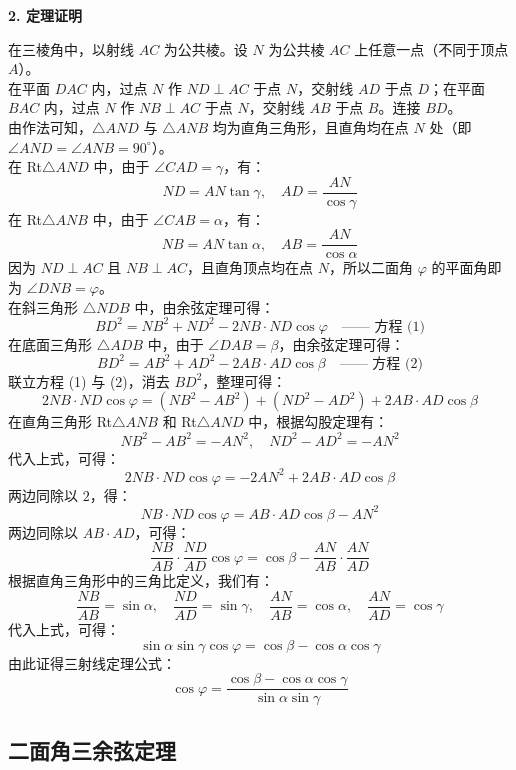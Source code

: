 \documentclass[11pt,a4paper]{ctexart}
\begin{document}
\noindent\textbf{2. 定理证明}\par
在三棱角中，以射线 $AC$ 为公共棱。设 $N$ 为公共棱 $AC$ 上任意一点（不同于顶点 $A$）。\\
在平面 $DAC$ 内，过点 $N$ 作 $ND \perp AC$ 于点 $N$，交射线 $AD$ 于点 $D$；在平面 $BAC$ 内，过点 $N$ 作 $NB \perp AC$ 于点 $N$，交射线 $AB$ 于点 $B$。连接 $BD$。\\
由作法可知，$\triangle AND$ 与 $\triangle ANB$ 均为直角三角形，且直角均在点 $N$ 处（即 $\angle AND = \angle ANB = 90^\circ$）。\\
在 Rt$\triangle AND$ 中，由于 $\angle CAD = \gamma$，有：
\[ ND = AN \tan\gamma, \quad AD = \frac{AN}{\cos\gamma} \]
在 Rt$\triangle ANB$ 中，由于 $\angle CAB = \alpha$，有：
\[ NB = AN \tan\alpha, \quad AB = \frac{AN}{\cos\alpha} \]
因为 $ND \perp AC$ 且 $NB \perp AC$，且直角顶点均在点 $N$，所以二面角 $\varphi$ 的平面角即为 $\angle DNB = \varphi$。\\
在斜三角形 $\triangle NDB$ 中，由余弦定理可得：
\[ BD^2 = NB^2 + ND^2 - 2 NB \cdot ND \cos\varphi \quad \text{—— 方程 (1)} \]
在底面三角形 $\triangle ADB$ 中，由于 $\angle DAB = \beta$，由余弦定理可得：
\[ BD^2 = AB^2 + AD^2 - 2 AB \cdot AD \cos\beta \quad \text{—— 方程 (2)} \]
联立方程 (1) 与 (2)，消去 $BD^2$，整理可得：
\[ 2 NB \cdot ND \cos\varphi = (NB^2 - AB^2) + (ND^2 - AD^2) + 2 AB \cdot AD \cos\beta \]
在直角三角形 Rt$\triangle ANB$ 和 Rt$\triangle AND$ 中，根据勾股定理有：
\[ NB^2 - AB^2 = -AN^2, \quad ND^2 - AD^2 = -AN^2 \]
代入上式，可得：
\[ 2 NB \cdot ND \cos\varphi = -2 AN^2 + 2 AB \cdot AD \cos\beta \]
两边同除以 $2$，得：
\[ NB \cdot ND \cos\varphi = AB \cdot AD \cos\beta - AN^2 \]
两边同除以 $AB \cdot AD$，可得：
\[ \frac{NB}{AB} \cdot \frac{ND}{AD} \cos\varphi = \cos\beta - \frac{AN}{AB} \cdot \frac{AN}{AD} \]
根据直角三角形中的三角比定义，我们有：
\[ \frac{NB}{AB} = \sin\alpha, \quad \frac{ND}{AD} = \sin\gamma, \quad \frac{AN}{AB} = \cos\alpha, \quad \frac{AN}{AD} = \cos\gamma \]
代入上式，可得：
\[ \sin\alpha \sin\gamma \cos\varphi = \cos\beta - \cos\alpha \cos\gamma \]
由此证得三射线定理公式：
\[ \cos\varphi = \frac{\cos\beta - \cos\alpha \cos\gamma}{\sin\alpha \sin\gamma} \]

\subsection{二面角三余弦定理}
\end{document}

